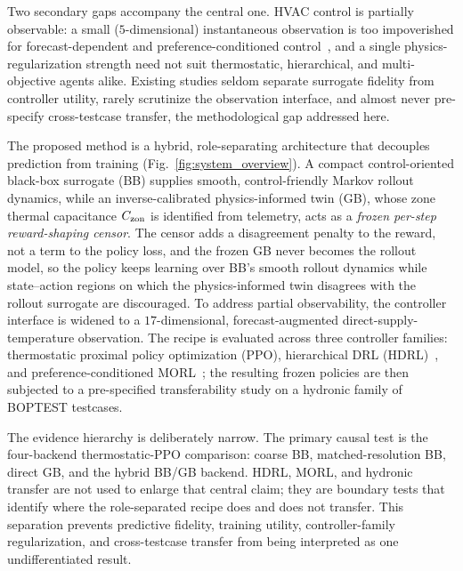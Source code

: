 Two secondary gaps accompany the central one. HVAC control is partially observable: a small ($5$-dimensional) instantaneous observation is too impoverished for forecast-dependent and preference-conditioned control~\citep{Byeon2025MaxMinMORL,Gao2024Predictive}, and a single physics-regularization strength need not suit thermostatic, hierarchical, and multi-objective agents alike. Existing studies seldom separate surrogate fidelity from controller utility, rarely scrutinize the observation interface, and almost never pre-specify cross-testcase transfer, the methodological gap addressed here.

The proposed method is a hybrid, role-separating architecture that decouples prediction from training (Fig.~\ref{fig:system_overview}). A compact control-oriented black-box surrogate (BB) supplies smooth, control-friendly Markov rollout dynamics, while an inverse-calibrated physics-informed twin (GB), whose zone thermal capacitance $C_{\mathrm{zon}}$ is identified from telemetry, acts as a \emph{frozen per-step reward-shaping censor}. The censor adds a disagreement penalty to the reward, not a term to the policy loss, and the frozen GB never becomes the rollout model, so the policy keeps learning over BB's smooth rollout dynamics while state--action regions on which the physics-informed twin disagrees with the rollout surrogate are discouraged. To address partial observability, the controller interface is widened to a $17$-dimensional, forecast-augmented direct-supply-temperature observation. The recipe is evaluated across three controller families: thermostatic proximal policy optimization (PPO), hierarchical DRL (HDRL)~\citep{Liao2025HDRL}, and preference-conditioned MORL~\citep{Byeon2025MaxMinMORL}; the resulting frozen policies are then subjected to a pre-specified transferability study on a hydronic family of BOPTEST testcases.

The evidence hierarchy is deliberately narrow. The primary causal test is the four-backend thermostatic-PPO comparison: coarse BB, matched-resolution BB, direct GB, and the hybrid BB/GB backend. HDRL, MORL, and hydronic transfer are not used to enlarge that central claim; they are boundary tests that identify where the role-separated recipe does and does not transfer. This separation prevents predictive fidelity, training utility, controller-family regularization, and cross-testcase transfer from being interpreted as one undifferentiated result.

